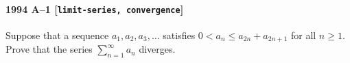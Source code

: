 \paragraph{1994 A--1 \textnormal{[\texttt{limit-series, convergence}]}}
Suppose that a sequence $a_1, a_2, a_3, \dots$ satisfies
$0 < a_n \leq a_{2n} + a_{2n+1}$ for all $n \geq 1$. Prove that the series
$\sum_{n=1}^{\infty} a_n$ diverges.
